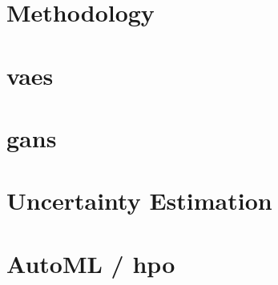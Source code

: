 \documentclass[a4paper,11pt]{article}
\begin{document}
\section{Methodology}


\section{\acp{vae}}


\newpage

\section{\acp{gan}}


\section{Uncertainty Estimation}


\section{AutoML / \ac{hpo}}

\end{document}
